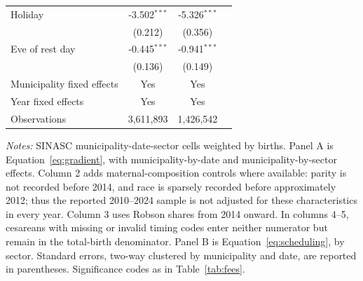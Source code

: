 \begin{table}[H]
{\begin{tabular}{lccccc}
\addlinespace[2pt]
Holiday & \multicolumn{2}{c}{-3.502$^{***}$} & \multicolumn{2}{c}{-5.326$^{***}$} & \\
 & \multicolumn{2}{c}{(0.212)} & \multicolumn{2}{c}{(0.356)} & \\
\addlinespace[2pt]
Eve of rest day & \multicolumn{2}{c}{-0.445$^{***}$} & \multicolumn{2}{c}{-0.941$^{***}$} & \\
 & \multicolumn{2}{c}{(0.136)} & \multicolumn{2}{c}{(0.149)} & \\
\addlinespace[2pt]
\midrule
Municipality fixed effects & \multicolumn{2}{c}{Yes} & \multicolumn{2}{c}{Yes} & \\
Year fixed effects & \multicolumn{2}{c}{Yes} & \multicolumn{2}{c}{Yes} & \\
Observations & \multicolumn{2}{c}{3,611,893} & \multicolumn{2}{c}{1,426,542} & \\
\bottomrule
\end{tabular}}
\begin{minipage}{\linewidth}\footnotesize
\textit{Notes:} SINASC municipality-date-sector cells weighted by births. Panel A is Equation~\eqref{eq:gradient}, with municipality-by-date and municipality-by-sector effects. Column 2 adds maternal-composition controls where available: parity is not recorded before 2014, and race is sparsely recorded before approximately 2012; thus the reported 2010--2024 sample is not adjusted for these characteristics in every year. Column 3 uses Robson shares from 2014 onward. In columns 4--5, cesareans with missing or invalid timing codes enter neither numerator but remain in the total-birth denominator. Panel B is Equation~\eqref{eq:scheduling}, by sector. Standard errors, two-way clustered by municipality and date, are reported in parentheses. Significance codes as in Table~\ref{tab:fees}.
\end{minipage}
\end{table}
